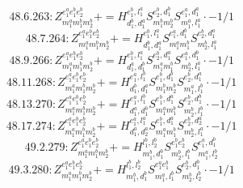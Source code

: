\documentclass[letterpaper,10pt,fleqn,leqno,onecolumn]{article}
\begin{document}
\begin{equation} \;\;\;\;\;\;  48.6.263: Z^{e_{1}^{a}e_{1}^{b}e_{2}^{b}}_{m_{1}^{a}m_{1}^{b}m_{2}^{b}}+=H^{e_{1}^{b},l_{1}^{a}}_{d_{1}^{b},d_{1}^{a}}S^{e_{2}^{b},d_{1}^{b}}_{m_{1}^{b}m_{2}^{b}}S^{e_{1}^{a},d_{1}^{a}}_{m_{1}^{a},l_{1}^{a}}\cdot -1/1 \end{equation}
\begin{equation} \;\;\;\;\;\;  48.7.264: Z^{e_{1}^{a}e_{1}^{b}e_{2}^{b}}_{m_{1}^{a}m_{1}^{b}m_{2}^{b}}+=H^{e_{1}^{b},l_{1}^{a}}_{d_{1}^{b},d_{1}^{a}}S^{e_{1}^{a},d_{1}^{b}}_{m_{1}^{a}m_{1}^{b}}S^{e_{2}^{b},d_{1}^{a}}_{m_{2}^{b},l_{1}^{a}} \end{equation}
\begin{equation} \;\;\;\;\;\;  48.9.266: Z^{e_{1}^{a}e_{1}^{b}e_{2}^{b}}_{m_{1}^{a}m_{1}^{b}m_{2}^{b}}+=H^{e_{1}^{b},l_{1}^{a}}_{d_{1}^{a},d_{1}^{b}}S^{e_{2}^{b},d_{1}^{a}}_{m_{1}^{a}m_{1}^{b}}S^{e_{1}^{a},d_{1}^{b}}_{m_{2}^{b},l_{1}^{a}}\cdot -1/1 \end{equation}
\begin{equation} \;\;\;\;\;\;  48.11.268: Z^{e_{1}^{a}e_{1}^{b}e_{2}^{b}}_{m_{1}^{a}m_{1}^{b}m_{2}^{b}}+=H^{e_{1}^{a},l_{1}^{b}}_{d_{1}^{b},d_{1}^{a}}S^{e_{1}^{b},d_{1}^{b}}_{m_{1}^{b}m_{2}^{b}}S^{e_{2}^{b},d_{1}^{a}}_{m_{1}^{a},l_{1}^{b}}\cdot -1/1 \end{equation}
\begin{equation} \;\;\;\;\;\;  48.13.270: Z^{e_{1}^{a}e_{1}^{b}e_{2}^{b}}_{m_{1}^{a}m_{1}^{b}m_{2}^{b}}+=H^{e_{1}^{a},l_{1}^{b}}_{d_{1}^{a},d_{1}^{b}}S^{e_{1}^{b},d_{1}^{a}}_{m_{1}^{a}m_{1}^{b}}S^{e_{2}^{b},d_{1}^{b}}_{m_{2}^{b},l_{1}^{b}}\cdot -1/1 \end{equation}
\begin{equation} \;\;\;\;\;\;  48.17.274: Z^{e_{1}^{a}e_{1}^{b}e_{2}^{b}}_{m_{1}^{a}m_{1}^{b}m_{2}^{b}}+=H^{e_{1}^{a},l_{1}^{a}}_{d_{1}^{a},d_{2}^{a}}S^{e_{1}^{b},d_{1}^{a}}_{m_{1}^{a}m_{1}^{b}}S^{e_{2}^{b},d_{2}^{a}}_{m_{2}^{b},l_{1}^{a}}\cdot -1/1 \end{equation}
\begin{equation} \;\;\;\;\;\;  49.2.279: Z^{e_{1}^{a}e_{1}^{b}e_{2}^{b}}_{m_{1}^{a}m_{1}^{b}m_{2}^{b}}+=H^{l_{1}^{b},l_{2}^{b}}_{m_{1}^{b},d_{1}^{b}}S^{e_{1}^{b}e_{2}^{b}}_{m_{2}^{b},l_{1}^{b}}S^{e_{1}^{a},d_{1}^{b}}_{m_{1}^{a},l_{2}^{b}} \end{equation}
\begin{equation} \;\;\;\;\;\;  49.3.280: Z^{e_{1}^{a}e_{1}^{b}e_{2}^{b}}_{m_{1}^{a}m_{1}^{b}m_{2}^{b}}+=H^{l_{1}^{b},l_{2}^{b}}_{m_{1}^{b},d_{1}^{b}}S^{e_{1}^{a}e_{1}^{b}}_{m_{1}^{a},l_{1}^{b}}S^{e_{2}^{b},d_{1}^{b}}_{m_{2}^{b},l_{2}^{b}}\cdot -1/1 \end{equation}
\end{document}
